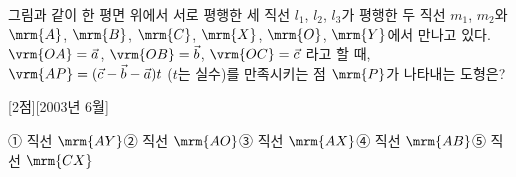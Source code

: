 
 그림과 같이 한 평면 위에서 서로 평행한 세 직선 $l_{1}
$, $l_{2}
$, $l_{3 
}$가 평행한 두 직선 $m_{1}
$, $m_{2 
}$와 $\mrm{A}
$, $\mrm{B}
$, $\mrm{C}
$, $\mrm{X}
$, $\mrm{O}
$, $\mrm{Y}
$에서 만나고 있다.
$\vrm{OA}=\vec{a}
$, $\vrm{OB}=\vec{b}
$, $\vrm{OC}=\vec{c}
$ 라고 할 때, $\vrm{AP}=(\vec{c}-\vec{b}-\vec{a})t
$ ($t 
$는 실수)를 만족시키는 점 $\mrm{P}
$가 나타내는 도형은? 

[2점][2003년 6월]

① 직선 $\mrm{AY}
$② 직선 $\mrm{AO}
$③ 직선 $\mrm{AX}
$④ 직선 $\mrm{AB}
$⑤ 직선 $\mrm{CX}
$

\vfill{}
\rule{0pt}{1mm}